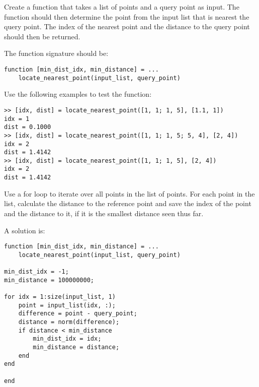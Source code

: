 \begin{ex}
Create a function that takes a list of points and a query point
as input.
The function should then determine the point from the 
input list that is nearest the query point.
The index of the nearest point and the distance to the 
query point should then be returned.

The function signature should be:
\begin{lstlisting}
function [min_dist_idx, min_distance] = ...
    locate_nearest_point(input_list, query_point)
\end{lstlisting}
Use the following examples to test the function:
\begin{lstlisting}
>> [idx, dist] = locate_nearest_point([1, 1; 1, 5], [1.1, 1])
idx = 1
dist = 0.1000
>> [idx, dist] = locate_nearest_point([1, 1; 1, 5; 5, 4], [2, 4])
idx = 2
dist = 1.4142
>> [idx, dist] = locate_nearest_point([1, 1; 1, 5], [2, 4])
idx = 2
dist = 1.4142
\end{lstlisting}
\begin{hint}
Use a for loop to iterate over all points in the list of points.
For each point in the list, calculate the distance to the 
reference point and save the index of the point and the
distance to it, if it is the smallest distance seen thus far.
\end{hint}
\begin{sol}
A solution is:
\begin{lstlisting}
function [min_dist_idx, min_distance] = ...
    locate_nearest_point(input_list, query_point)

min_dist_idx = -1;
min_distance = 100000000;

for idx = 1:size(input_list, 1)
    point = input_list(idx, :);
    difference = point - query_point;
    distance = norm(difference);
    if distance < min_distance
        min_dist_idx = idx;
        min_distance = distance;
    end
end

end
\end{lstlisting}
\end{sol}
\end{ex}
 